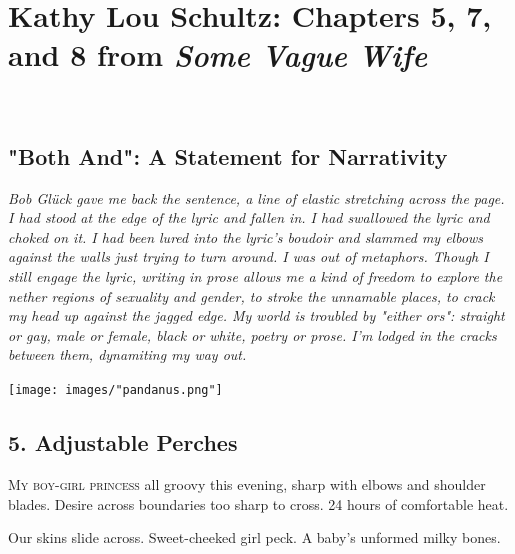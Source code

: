 \documentclass[
]{memoir}
\begin{document}
~

\hypertarget{kathy-lou-schultz-chapters-5-7-and-8-from-some-vague-wife}{%
\chapter{\texorpdfstring{Kathy Lou Schultz: Chapters 5, 7, and 8 from
\emph{Some Vague
Wife}}{Kathy Lou Schultz: Chapters 5, 7, and 8 from Some Vague Wife}}\label{kathy-lou-schultz-chapters-5-7-and-8-from-some-vague-wife}}

~

\hypertarget{both-and-a-statement-for-narrativity}{%
\section*{"Both And": A Statement for
Narrativity}\label{both-and-a-statement-for-narrativity}}

\emph{Bob Glück gave me back the sentence, a line of elastic stretching
across the page. I had stood at the edge of the lyric and fallen in. I
had swallowed the lyric and choked on it. I had been lured into the
lyric's boudoir and slammed my elbows against the walls just trying to
turn around. I was out of metaphors. Though I still engage the lyric,
writing in prose allows me a kind of freedom to explore the nether
regions of sexuality and gender, to stroke the unnamable places, to
crack my head up against the jagged edge. My world is troubled by
"either ors": straight or gay, male or female, black or white, poetry or
prose. I'm lodged in the cracks between them, dynamiting my way out.}

\begin{center}\texttt{[image: images/"pandanus.png"]}\end{center}

\hypertarget{adjustable-perches}{%
\section*{5. Adjustable Perches}\label{adjustable-perches}}

\lettrine[lines=3, findent=0em, nindent=0.1em, lhang=0]{M}{y boy-girl princess}
all groovy this evening, sharp with elbows and shoulder blades. Desire
across boundaries too sharp to cross. 24 hours of comfortable heat.

Our skins slide across. Sweet-cheeked girl peck. A baby's unformed milky
bones.
\end{document}
